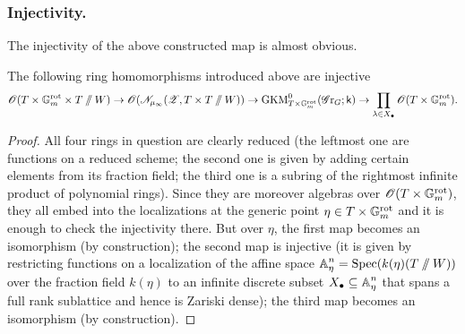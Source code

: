 \subsubsection{Injectivity.}\label{subsubsection: injectivity}
The injectivity of the above constructed map is almost obvious.
\begin{lemma}\label{lemma: injectivity}
The following ring homomorphisms introduced above are injective
\begin{equation*}
    \operatorname{\mathscr{O}}(T \times \mathbb{G}_m^{\mathrm{rot}} \times T \sslash W) \to \operatorname{\mathscr{O}}(\mathscr{N}_{\mu_{\infty}}(\operatorname{\mathscr{Z}}, T \times T \sslash W))  \to \operatorname{GKM}^{0}_{T \times \mathbb{G}_m^{\mathrm{rot}}}(\operatorname{\mathscr{G}r}_G; \mathsf{k}) \to \prod_{\lambda \in X_{\bullet}} \operatorname{\mathscr{O}}(T \times \mathbb{G}_m^{\mathrm{rot}}).
\end{equation*}
\end{lemma}
\begin{proof}
All four rings in question are clearly reduced (the leftmost one are functions on a reduced scheme; the second one is given by adding certain elements from its fraction field; the third one is a subring of the rightmost infinite product of polynomial rings). Since they are moreover algebras over $\operatorname{\mathscr{O}}(T \times \mathbb{G}_m^{\mathrm{rot}})$, they all embed into the localizations at the generic point $\eta \in T \times \mathbb{G}_m^{\mathrm{rot}}$ and it is enough to check the injectivity there. But over $\eta$, the first map becomes an isomorphism (by construction); the second map is injective (it is given by restricting functions on a localization of the affine space $\operatorname{\mathbb{A}}^n_{\eta} = \operatorname{Spec}(k(\eta)(T\sslash W))$ over the fraction field $k(\eta)$ to an infinite discrete subset $X_{\bullet} \subseteq \operatorname{\mathbb{A}}^n_{\eta}$ that spans a full rank sublattice and hence is Zariski dense); the third map becomes an isomorphism (by construction).
\end{proof}



